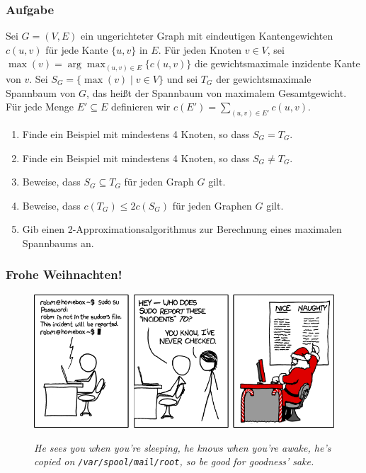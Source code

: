 \begin{frame}
	\frametitle{Aufgabe}
	
	Sei $G=(V,E)$ ein ungerichteter Graph mit eindeutigen Kantengewichten $c(u,v)$ für jede Kante $\{u,v\}$ in $E$.
Für jeden Knoten $v \in V$, sei $\max(v)=\arg\max_{(u,v)\in E}\{c(u,v)\}$ die gewichtsmaximale inzidente Kante von $v$.
Sei $S_G=\{\max(v) \mid v \in V\}$ und sei $T_G$ der gewichtsmaximale Spannbaum von $G$, das heißt der Spannbaum von maximalem Gesamtgewicht.
Für jede Menge $E' \subseteq E$ definieren wir $c(E')=\sum_{(u,v)\in E'}c(u,v)$.
\begin{enumerate}
 \item Finde ein Beispiel mit mindestens 4 Knoten, so dass $S_G=T_G$.
 \item Finde ein Beispiel mit mindestens 4 Knoten, so dass $S_G\not=T_G$.
 \item Beweise, dass $S_G\subseteq T_G$ für jeden Graph $G$ gilt.
 \item Beweise, dass $c(T_G)\leq 2c(S_G)$ für jeden Graphen $G$ gilt.
 \item Gib einen 2-Approximationsalgorithmus zur Berechnung eines maximalen Spannbaums an.
\end{enumerate}
\end{frame}

\begin{frame}
	\frametitle{Frohe Weihnachten!}
	
	\begin{figure}[H]
		
		
		\includegraphics[width= \textwidth]{images/838_incident.png}
		
		\textit{\scriptsize{He sees you when you're sleeping, he knows when you're awake, he's copied on \texttt{/var/spool/mail/root}, so be good for goodness' sake.}}
		
	\end{figure}
\end{frame}


